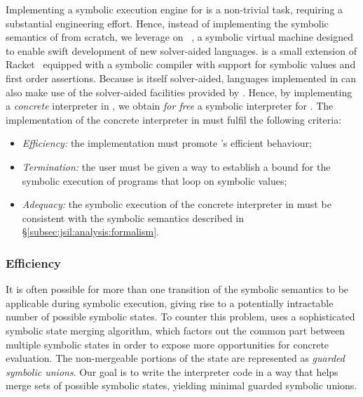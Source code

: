 Implementing a symbolic execution engine for \jsil is a non-trivial 
task, requiring a substantial engineering effort. 
% 
% 
Hence, instead of implementing the symbolic semantics of \jsil from scratch, we leverage on 
\rosette~\cite{Rosette1,Rosette2}, a symbolic virtual machine designed to 
enable swift development of new 
solver-aided languages. 
%
\rosette is a small extension of Racket~\cite{racket} equipped with a symbolic compiler with support 
for symbolic values and first order assertions. Because \rosette is itself solver-aided, languages 
implemented in \rosette can also make use of the solver-aided facilities provided by \rosette. 
Hence, by implementing a \emph{concrete} \jsil interpreter in \rosette, we obtain \emph{for free} a symbolic 
interpreter for \jsil. %
%
The implementation of the concrete interpreter in \rosette must fulfil the following criteria:

\begin{itemize}          
   \item \emph{Efficiency:} the implementation must promote \rosette's efficient behaviour;
   
   \item \emph{Termination:} the user must be given a way to establish a bound for the symbolic execution 
            of programs that loop on symbolic values; 
  
   \item \emph{Adequacy:} the symbolic execution of the concrete interpreter in \rosette 
            must be consistent with the symbolic semantics described in \S\ref{subsec:jsil:analysis:formalism}. 
\end{itemize}

\subsubsection{Efficiency}
It is often possible for more than one transition of the symbolic 
semantics to be applicable during symbolic execution, 
giving rise to a potentially intractable number of possible symbolic states. 
To counter this problem, \rosette uses a sophisticated 
symbolic state merging algorithm, which factors out the common 
part between multiple symbolic states  in order to expose more 
opportunities for concrete evaluation. The non-mergeable portions of the state 
are represented as \emph{guarded symbolic unions}. 
Our goal is to write the interpreter code in a way that helps 
\rosette merge sets of possible symbolic states, yielding minimal 
guarded symbolic unions.

